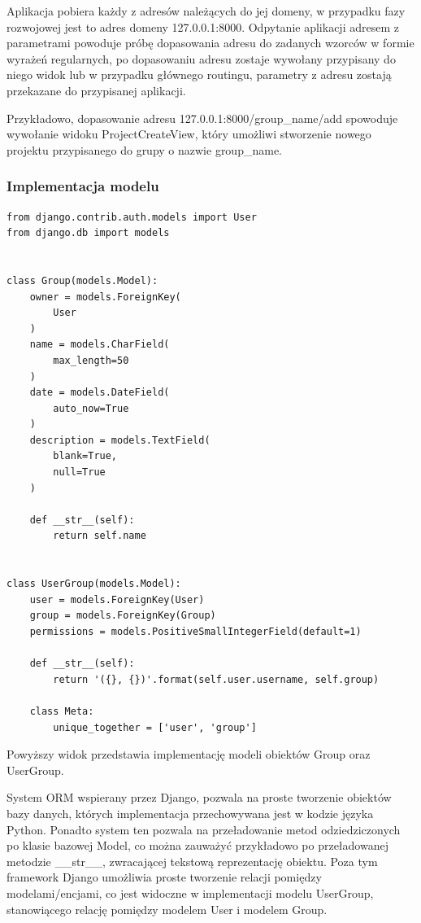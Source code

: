 \documentclass[12pt]{article}
\begin{document}
    Aplikacja pobiera każdy z adresów należących do jej domeny, w przypadku fazy rozwojowej jest to adres domeny 127.0.0.1:8000. Odpytanie aplikacji adresem z parametrami powoduje próbę dopasowania adresu do zadanych wzorców w formie wyrażeń regularnych, po dopasowaniu adresu zostaje wywołany przypisany do niego widok lub w przypadku głównego routingu, parametry z adresu zostają przekazane do przypisanej aplikacji. 
    
Przykładowo, dopasowanie adresu 127.0.0.1:8000/group\_name/add spowoduje wywołanie widoku ProjectCreateView, który umożliwi stworzenie nowego projektu przypisanego do grupy o nazwie group\_name.


\subsubsection{Implementacja modelu}

\begin{lstlisting}[caption={groups/models.py}]
from django.contrib.auth.models import User
from django.db import models


class Group(models.Model):
    owner = models.ForeignKey(
        User
    )
    name = models.CharField(
        max_length=50
    )
    date = models.DateField(
        auto_now=True
    )
    description = models.TextField(
        blank=True,
        null=True
    )

    def __str__(self):
        return self.name


class UserGroup(models.Model):
    user = models.ForeignKey(User)
    group = models.ForeignKey(Group)
    permissions = models.PositiveSmallIntegerField(default=1)

    def __str__(self):
        return '({}, {})'.format(self.user.username, self.group)

    class Meta:
        unique_together = ['user', 'group']
\end{lstlisting}

    Powyższy widok przedstawia implementację modeli obiektów Group oraz UserGroup. 
    
System ORM wspierany przez Django, pozwala na proste tworzenie obiektów bazy danych, których implementacja przechowywana jest w kodzie języka Python. Ponadto system ten pozwala na przeładowanie metod odziedziczonych po klasie bazowej Model, co można zauważyć przykładowo po przeładowanej metodzie \_\_str\_\_, zwracającej tekstową reprezentację obiektu. Poza tym framework Django umożliwia proste tworzenie relacji pomiędzy modelami/encjami, co jest widoczne w implementacji modelu UserGroup, stanowiącego relację pomiędzy modelem User i modelem Group. 
\end{document}
